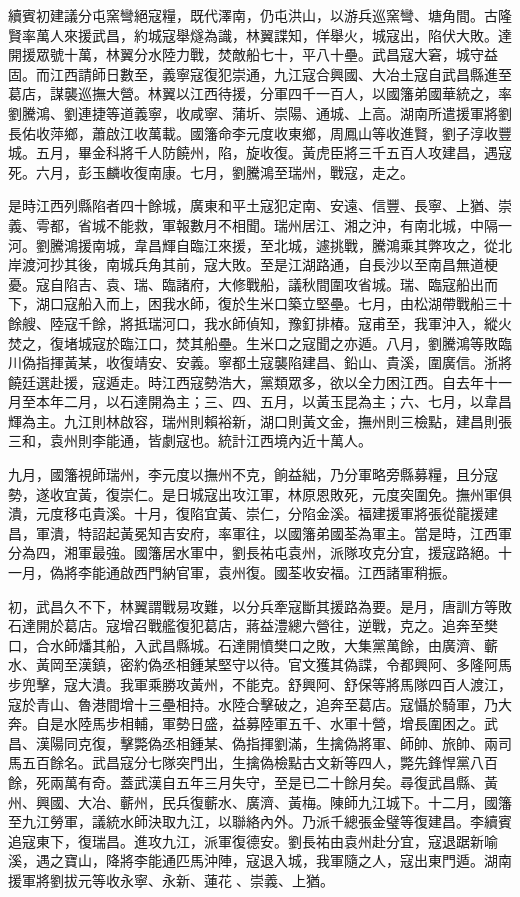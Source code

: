 \begin{pinyinscope}
續賓初建議分屯窯彎絕寇糧，既代澤南，仍屯洪山，以游兵巡窯彎、塘角間。古隆賢率萬人來援武昌，約城寇舉燧為識，林翼諜知，佯舉火，城寇出，陷伏大敗。達開援眾號十萬，林翼分水陸力戰，焚敵船七十，平八十壘。武昌寇大窘，城守益固。而江西請師日數至，義寧寇復犯崇通，九江寇合興國、大冶土寇自武昌縣進至葛店，謀襲巡撫大營。林翼以江西待援，分軍四千一百人，以國籓弟國華統之，率劉騰鴻、劉連捷等道義寧，收咸寧、蒲圻、崇陽、通城、上高。湖南所遣援軍將劉長佑收萍鄉，蕭啟江收萬載。國籓命李元度收東鄉，周鳳山等收進賢，劉子淳收豐城。五月，畢金科將千人防饒州，陷，旋收復。黃虎臣將三千五百人攻建昌，遇寇死。六月，彭玉麟收復南康。七月，劉騰鴻至瑞州，戰寇，走之。

是時江西列縣陷者四十餘城，廣東和平土寇犯定南、安遠、信豐、長寧、上猶、崇義、雩都，省城不能救，軍報數月不相聞。瑞州居江、湘之沖，有南北城，中隔一河。劉騰鴻援南城，韋昌輝自臨江來援，至北城，遽挑戰，騰鴻乘其弊攻之，從北岸渡河抄其後，南城兵角其前，寇大敗。至是江湖路通，自長沙以至南昌無道梗憂。寇自陷吉、袁、瑞、臨諸府，大修戰船，議秋間圍攻省城。瑞、臨寇船出而下，湖口寇船入而上，困我水師，復於生米口築立堅壘。七月，由松湖帶戰船三十餘艘、陸寇千餘，將抵瑞河口，我水師偵知，豫釘排椿。寇甫至，我軍沖入，縱火焚之，復堵城寇於臨江口，焚其船壘。生米口之寇聞之亦遁。八月，劉騰鴻等敗臨川偽指揮黃某，收復靖安、安義。寧都土寇襲陷建昌、鉛山、貴溪，圍廣信。浙將饒廷選赴援，寇遁走。時江西寇勢浩大，黨類眾多，欲以全力困江西。自去年十一月至本年二月，以石達開為主；三、四、五月，以黃玉昆為主；六、七月，以韋昌輝為主。九江則林啟容，瑞州則賴裕新，湖口則黃文金，撫州則三檢點，建昌則張三和，袁州則李能通，皆劇寇也。統計江西境內近十萬人。

九月，國籓視師瑞州，李元度以撫州不克，餉益絀，乃分軍略旁縣募糧，且分寇勢，遂收宜黃，復崇仁。是日城寇出攻江軍，林原恩敗死，元度突圍免。撫州軍俱潰，元度移屯貴溪。十月，復陷宜黃、崇仁，分陷金溪。福建援軍將張從龍援建昌，軍潰，特詔起黃冕知吉安府，率軍往，以國籓弟國荃為軍主。當是時，江西軍分為四，湘軍最強。國籓居水軍中，劉長祐屯袁州，派隊攻克分宜，援寇路絕。十一月，偽將李能通啟西門納官軍，袁州復。國荃收安福。江西諸軍稍振。

初，武昌久不下，林翼謂戰易攻難，以分兵牽寇斷其援路為要。是月，唐訓方等敗石達開於葛店。寇增召戰艦復犯葛店，蔣益澧總六營往，逆戰，克之。追奔至樊口，合水師燔其船，入武昌縣城。石達開憤樊口之敗，大集黨萬餘，由廣濟、蘄水、黃岡至漢鎮，密約偽丞相鍾某堅守以待。官文獲其偽諜，令都興阿、多隆阿馬步兜擊，寇大潰。我軍乘勝攻黃州，不能克。舒興阿、舒保等將馬隊四百人渡江，寇於青山、魯港間增十三壘相持。水陸合擊破之，追奔至葛店。寇懾於騎軍，乃大奔。自是水陸馬步相輔，軍勢日盛，益募陸軍五千、水軍十營，增長圍困之。武昌、漢陽同克復，擊斃偽丞相鍾某、偽指揮劉滿，生擒偽將軍、師帥、旅帥、兩司馬五百餘名。武昌寇分七隊突門出，生擒偽檢點古文新等四人，斃先鋒悍黨八百餘，死兩萬有奇。蓋武漢自五年三月失守，至是已二十餘月矣。尋復武昌縣、黃州、興國、大冶、蘄州，民兵復蘄水、廣濟、黃梅。陳師九江城下。十二月，國籓至九江勞軍，議統水師決取九江，以聯絡內外。乃派千總張金璧等復建昌。李續賓追寇東下，復瑞昌。進攻九江，派軍復德安。劉長祐由袁州赴分宜，寇退踞新喻溪，遇之寶山，降將李能通匹馬沖陣，寇退入城，我軍隨之人，寇出東門遁。湖南援軍將劉拔元等收永寧、永新、蓮花、崇義、上猶。


\end{pinyinscope}
